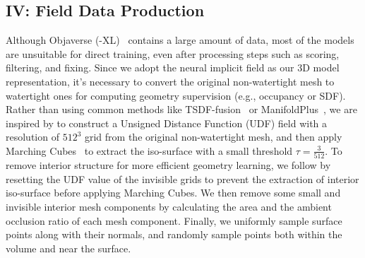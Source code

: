 \subsection{IV: Field Data Production}
Although Objaverse (-XL)~\cite{deitke2023objaverse,deitke2024objaverse} contains a large amount of data, most of the models are unsuitable for direct training, even after processing steps such as scoring, filtering, and fixing. 
Since we adopt the neural implicit field as our 3D model representation, it's necessary to convert the original non-watertight mesh to watertight ones for computing geometry supervision (e.g., occupancy or SDF). 
Rather than using common methods like TSDF-fusion~\cite{DBLP:conf/ismar/NewcombeIHMKDKSHF11} or ManifoldPlus~\cite{DBLP:journals/corr/abs-1802-01698,DBLP:journals/corr/abs-2005-11621}, we are inspired by \cite{DBLP:journals/tog/WangLT22,zhang2024clay} to construct a Unsigned Distance Function (UDF) field with a resolution of $512^3$ grid from the original non-watertight mesh, and then apply Marching Cubes~\cite{DBLP:conf/siggraph/LorensenC87} to extract the iso-surface with a small threshold $\tau=\frac{3}{512}$. 
To remove interior structure for more efficient geometry learning, we follow \cite{zhang2024clay} by resetting the UDF value of the invisible grids to prevent the extraction of interior iso-surface before applying Marching Cubes. 
We then remove some small and invisible interior mesh components by calculating the area and the ambient occlusion ratio of each mesh component.
Finally, we uniformly sample surface points along with their normals, and randomly sample points both within the volume and near the surface.


